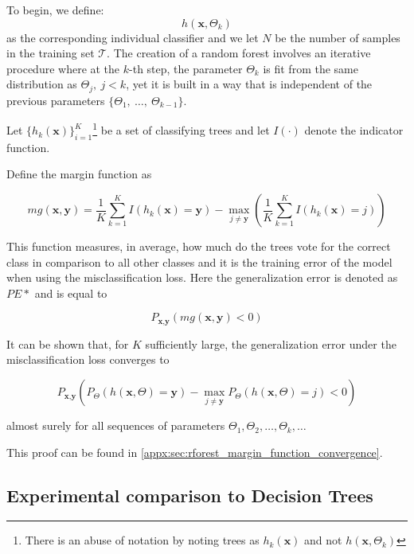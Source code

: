 To begin, we define:
$$h(\textbf{x},\Theta_k)$$
as the corresponding individual classifier and we let $N$ be the number of samples in the training set $\mathcal{T}$.
The creation of a random forest involves an iterative procedure where at the $k$-th step, the parameter $\Theta_k$ is fit from the same distribution as $\Theta_j, \ j<k$, yet it is built in a way that is independent of the previous parameters $\{\Theta_1, \ \ldots, \ \Theta_{k-1} \}$. %


Let $\{ h_k(\textbf{x}) \}_{i=1}^K$\footnote{There is an abuse of notation by noting trees as $h_k(\textbf{x})$ and not $h(\textbf{x}, \Theta_k)$ } be a set of classifying trees and let $I(\cdot)$ denote the indicator function.

Define the margin function as

\begin{equation}
\label{eq:rf-marginFun}
mg(\textbf{x},\textbf{y}) = \frac{1}{K}  \sum_{k=1}^K I(h_k(\textbf{x}) = \textbf{y})
- \max_{j\neq \textbf{y}}\left(\frac{1}{K} \sum_{k=1}^K I(h_k(\textbf{x}) = j) \right)
\end{equation}


This function measures, in average, how much do the trees vote for the correct class in comparison to all other classes and it is the training error of the model when using the misclassification loss.
Here the generalization error is denoted as $PE*$ and is equal to

\begin{equation}
P_{\textbf{x}, \textbf{y} }\left(mg(\textbf{x},\textbf{y}) <0\right)
\end{equation}

 It can be shown that, for $K$ sufficiently large, the generalization error under the misclassification loss converges to

\begin{equation}
 P_{\textbf{x}, \textbf{y} } \left( P_{\Theta} (h(\textbf{x}, \Theta) = \textbf{y}) - \max_{j \neq \textbf{y}} P_{\Theta} (h(\textbf{x}, \Theta) = j) < 0\right)
 \end{equation}

almost surely for all sequences of parameters $\Theta_1,\Theta_2, \ldots, \Theta_k,\ldots$

This proof can be found in \cref{appx:sec:rforest_margin_function_convergence}.


\subsection{ Experimental comparison to Decision Trees}\label{subsection:random_forests_comparison_trees}


